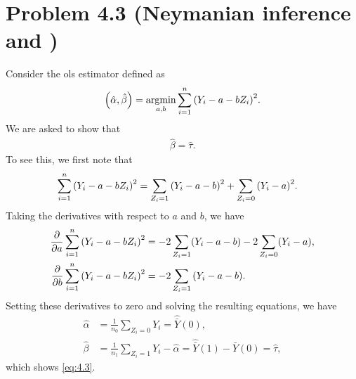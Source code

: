 \documentclass[10pt]{article}
\begin{document}
\section*{Problem 4.3 (Neymanian inference and )}

Consider the \gls{ols} estimator defined as
\begin{align*}
  {\left( \hat{\alpha}, \hat{\beta} \right)}
  = \operatorname*{argmin}_{a, b} \sum_{i=1}^n {\left( Y_i - a - b Z_i \right)}^2.
\end{align*}
We are asked to show that 
\begin{align*}
  \hat{\beta} = \hat{\tau}. \tag{4.3}
  \label{eq:4.3}
\end{align*}
To see this, we first note that
\begin{align*}
  \sum_{i=1}^n {\left( Y_i - a - b Z_i \right)}^2
  &= \sum_{Z_i = 1} {\left( Y_i - a - b \right)}^2 + \sum_{Z_i = 0} {\left( Y_i - a \right)}^2.
\end{align*}
Taking the derivatives with respect to $a$ and $b$,
we have
\begin{align*}
  \frac{\partial}{\partial a} \sum_{i=1}^n {\left( Y_i - a - b Z_i \right)}^2
  &= -2 \sum_{Z_i = 1} (Y_i - a - b) - 2 \sum_{Z_i = 0} (Y_i - a), \\
  \frac{\partial}{\partial b} \sum_{i=1}^n {\left( Y_i - a - b Z_i \right)}^2
  &= -2 \sum_{Z_i = 1} {\left( Y_i - a - b \right)}.
\end{align*}
Setting these derivatives to zero
and solving the resulting equations,
we have
\begin{align*}
  \hat{\alpha} 
  &= \frac{1}{n_0} \sum_{Z_i = 0} Y_i 
  = \hat{\bar{Y}}(0), \\
  \hat{\beta} 
  &= \frac{1}{n_1} \sum_{Z_i = 1} Y_i - \hat{\alpha}
  = \hat{\bar{Y}}(1) - \hat{\bar{Y}}(0) 
  = \hat{\tau},
\end{align*}
which shows \cref{eq:4.3}.
\end{document}
